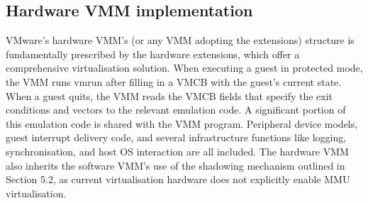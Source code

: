 \subsection{Hardware VMM implementation}
VMware’s hardware VMM's (or any VMM adopting the
extensions) structure is fundamentally prescribed by the
hardware extensions, which offer a comprehensive
virtualisation solution. When executing a guest in
protected mode, the VMM runs vmrun after filling in a
VMCB with the guest's current state. When a guest quits,
the VMM reads the VMCB fields that specify the exit
conditions and vectors to the relevant emulation code. A
significant portion of this emulation code is shared with
the VMM program. Peripheral device models, guest
interrupt delivery code, and several infrastructure
functions like logging, synchronisation, and host OS
interaction are all included. The hardware VMM also
inherits the software VMM's use of the shadowing
mechanism outlined in Section 5.2, as current
virtualisation hardware does not explicitly enable MMU
virtualisation. 


